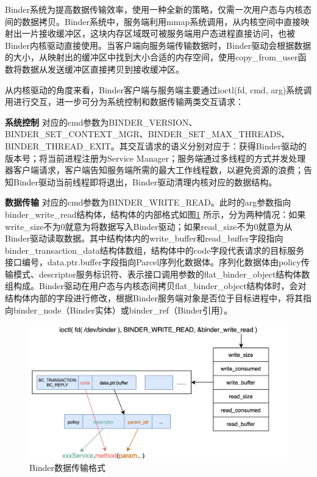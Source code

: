 \documentclass[winfonts,master,twoside]{njuthesis}
\begin{document}
Binder系统为提高数据传输效率，使用一种全新的策略，仅需一次用户态与内核态间的数据拷贝。Binder系统中，服务端利用mmap系统调用，从内核空间中直接映射出一片接收缓冲区，这块内存区域既可被服务端用户态进程直接访问，也被Binder内核驱动直接使用。当客户端向服务端传输数据时，Binder驱动会根据数据的大小，从映射出的缓冲区中找到大小合适的内存空间，使用copy\_from\_user函数将数据从发送缓冲区直接拷贝到接收缓冲区。

从内核驱动的角度来看，Binder客户端与服务端主要通过ioctl(fd, cmd, arg)系统调用进行交互，进一步可分为系统控制和数据传输两类交互请求：

\textbf{系统控制} \quad 对应的cmd参数为BINDER\_VERSION、BINDER\_SET\_CONTEXT\_MGR、BINDER\_SET\_MAX\_THREADS、BINDER\_THREAD\_EXIT。其交互请求的语义分别对应于：获得Binder驱动的版本号；将当前进程注册为Service Manager；服务端通过多线程的方式并发处理器客户端请求，客户端告知服务端所需的最大工作线程数，以避免资源的浪费；告知Binder驱动当前线程即将退出，Binder驱动清理内核对应的数据结构。

\textbf{数据传输} \quad 对应的cmd参数为BINDER\_WRITE\_READ。此时的arg参数指向binder\_write\_read结构体，结构体的内部格式如图\ref{binder-ioctl-data} 所示，分为两种情况：如果write\_size不为0就意为将数据写入Binder驱动；如果read\_size不为0就意为从Binder驱动读取数据。其中结构体内的write\_buffer和read\_buffer字段指向binder\_transaction\_data结构体数组，结构体中的code字段代表请求的目标服务接口编号，data.ptr.buffer字段指向Parcel序列化数据体。序列化数据体由policy传输模式、descriptor服务标识符、表示接口调用参数的flat\_binder\_object结构体数组构成。Binder驱动在用户态与内核态间拷贝flat\_binder\_object结构体时，会对结构体内部的字段进行修改，根据Binder服务端对象是否位于目标进程中，将其指向binder\_node（Binder实体）或binder\_ref（Binder引用）。

\begin{figure}
	\centering
	\includegraphics[width=\textwidth]{figure/2-background/binder-ioctl-data.png}
	\caption{Binder数据传输格式}
	\label{binder-ioctl-data}
\end{figure}
\end{document}
